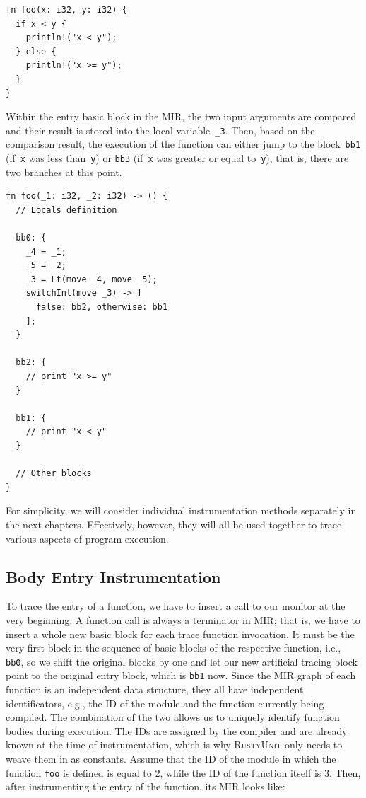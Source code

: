 \documentclass[paper=a4,%
  twoside,%
  BCOR4mm,%
  abstract=true,%
  toc=bibliography,%
  chapterprefix=true,%
  toc=bibliographynumbered,%
  open=right,%
  english,%
  pagesize=pdftex]{scrreprt}
\newcommand{\tech}{\textsc{RustyUnit}\xspace}
\newcommand{\mir}{\ac{MIR}\xspace}
\begin{document}
\begin{lstlisting}[style=boxed, caption={Example function to instrument}, label=lst:example-function-to-instrument]
fn foo(x: i32, y: i32) {
  if x < y {
    println!("x < y");
  } else {
    println!("x >= y");
  }
}
\end{lstlisting}

Within the entry basic block in the \mir, the two input arguments are compared and their result is stored into the local variable~\texttt{\string_3}. Then, based on the comparison result, the execution of the function can either jump to the block~\texttt{bb1} (if~\texttt{x} was less than~\texttt{y}) or \texttt{bb3} (if~\texttt{x} was greater or equal to~\texttt{y}), that is, there are two branches at this point.
\begin{lstlisting}[style=boxed, caption={MIR of the \texttt{foo} function}, label=lst:mir-of-example-function-to-instrument]
fn foo(_1: i32, _2: i32) -> () {
  // Locals definition

  bb0: {
    _4 = _1;
    _5 = _2;
    _3 = Lt(move _4, move _5);
    switchInt(move _3) -> [
      false: bb2, otherwise: bb1
    ];
  }

  bb2: {
    // print "x >= y"
  }

  bb1: {
    // print "x < y"
  }

  // Other blocks
}
\end{lstlisting}

For simplicity, we will consider individual instrumentation methods separately in the next chapters. Effectively, however, they will all be used together to trace various aspects of program execution.

\subsection{Body Entry Instrumentation}
To trace the entry of a function, we have to insert a call to our monitor at the very beginning. A function call is always a terminator in \mir; that is, we have to insert a whole new basic block for each trace function invocation. It must be the very first block in the sequence of basic blocks of the respective function, i.e., \texttt{bb0}, so we shift the original blocks by one and let our new artificial tracing block point to the original entry block, which is \texttt{bb1} now. Since the \mir graph of each function is an independent data structure, they all have independent identificators, e.g., the ID of the module and the function currently being compiled. The combination of the two allows us to uniquely identify function bodies during execution. The IDs are assigned by the compiler and are already known at the time of instrumentation, which is why \tech only needs to weave them in as constants. Assume that the ID of the module in which the function \texttt{foo} is defined is equal to $2$, while the ID of the function itself is $3$. Then, after instrumenting the entry of the function, its \mir looks like:
\end{document}
